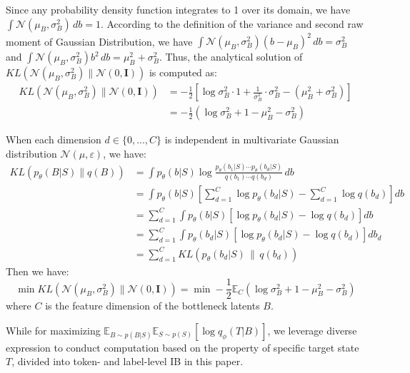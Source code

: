 \documentclass{article}
\begin{document}
Since any probability density function integrates to 1 over its domain, we have $\int \mathcal{N}(\mu_B, \sigma^2_B) \, db=1$. According to the definition of the variance and second raw moment of Gaussian Distribution, we have $\int \mathcal{N}(\mu_B, \sigma^2_B)(b - \mu_B)^2 \, db=\sigma^2_B$ and $\int \mathcal{N}(\mu_B, \sigma^2_B) b^2 \, db=\mu^2_B+\sigma^2_B$. Thus, the analytical solution of $KL( \mathcal{N}(\mu_B, \sigma^2_B)\parallel\mathcal{N}(0,\textbf{I}))$ is computed as:
\begin{equation}
\begin{aligned}
    KL( \mathcal{N}(\mu_B, \sigma^2_B)\parallel\mathcal{N}(0,\textbf{I})) &=-\frac{1}{2} \left[ \log \sigma^2_B \cdot  1+ \frac{1}{\sigma^2_B} \cdot \sigma^2_B - (\mu^2_B+\sigma^2_B)\right]\\
    &=-\frac{1}{2} \left( \log \sigma^2_B + 1 - \mu^2_B-\sigma^2_B\right)
\end{aligned}
\end{equation}

When each dimension $d\in \{0,...,C\}$ is independent in multivariate Gaussian distribution $\mathcal{N}(\mu, \varepsilon)$, we have:
\begin{equation}
\begin{aligned}
    KL( p_\theta(B|S)\parallel q(B)) &= \int p_\theta(b|S) \log \frac{p_\theta(b_1|S) \cdots p_\theta(b_d|S)}{q(b_1) \cdots q(b_d)} \, db \\
    &= \int p_\theta(b|S) \left[ \sum_{d=1}^C \log p_\theta(b_d|S) - \sum_{d=1}^C \log q(b_d) \right] db \\
    &= \sum_{d=1}^C \int p_\theta(b|S) \left[ \log p_\theta(b_d|S) - \log q(b_d) \right] db \\
    &= \sum_{d=1}^C \int p_\theta(b_d|S) \left[ \log p_\theta(b_d|S) - \log q(b_d) \right] db_d \\
    &= \sum_{d=1}^C KL\left(p_\theta(b_d|S) \, \| \, q(b_d)\right)
\end{aligned}
\end{equation}
Then we have:
\begin{equation}
    \min KL( \mathcal{N}(\mu_B, \sigma^2_B)\parallel\mathcal{N}(0,\textbf{I})) =\min -\frac{1}{2} \mathbb{E}_C  \left(\log \sigma^2_B + 1 - \mu^2_B-\sigma^2_B\right)
\label{equ_ib_derive1}
\end{equation}
where $C$ is the feature dimension of the bottleneck latents $B$.

While for maximizing $\mathbb{E}_{B\sim p(B|S)}\mathbb{E}_{S\sim p(S)} [\log q_\phi(T|B)]$, we leverage diverse expression to conduct computation based on the property of specific target state $T$, divided into token- and label-level IB in this paper. 
\end{document}
